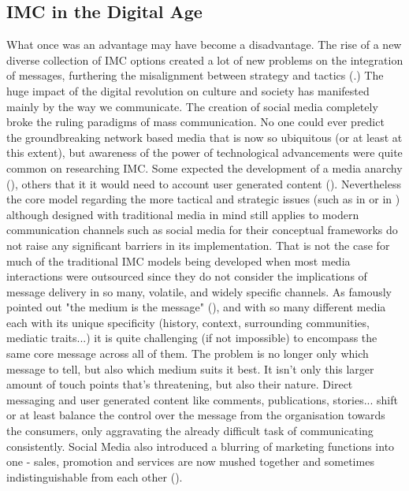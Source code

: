 \documentclass[11pt]{article}
\begin{document}
 \subsection{IMC in the Digital Age}\label{digitalage}
 
 What once was an advantage may have become a disadvantage. The rise of a new diverse collection of IMC options created a lot of new problems on the integration of messages, furthering the misalignment between strategy and tactics (\cite{holm}.) The huge impact of the digital revolution on culture and society has manifested mainly by the way we communicate. The creation of social media completely broke the ruling paradigms of mass communication. No one could ever predict the groundbreaking network based media that is now so ubiquitous (or at least at this extent), but awareness of the power of technological advancements were quite common on researching IMC. Some expected the development of a media anarchy (\cite{solomon}), others that it it would need to account user generated content (\cite{ananda}). Nevertheless the core model regarding the more tactical and strategic issues (such as \citeauthor{schultz} in \citeyear{schultz} or \citeauthor{duncan} in \citeyear{duncan}) although designed with traditional media in mind still applies to modern communication channels such as social media for their conceptual frameworks do not raise any significant barriers in its implementation. That is not the case for much of the traditional IMC models being developed when most media interactions were outsourced since they do not consider the implications of message delivery in so many, volatile, and widely specific channels. As \citeauthor{mcluhan} famously pointed out "the medium is the message" (\citeyear{mcluhan}), and with so many different media each with its unique specificity (history, context, surrounding communities, mediatic traits...) it is quite challenging (if not impossible) to encompass the same core message across all of them. The problem is no longer only which message to tell, but also which medium suits it best. It isn't only this larger amount of touch points that's threatening, but also their nature. Direct messaging and user generated content like comments, publications, stories... shift or at least balance the control over the message from the organisation towards the consumers, only aggravating the already difficult task of communicating consistently. Social Media also introduced a blurring of marketing functions into one - sales, promotion and services are now mushed together and sometimes indistinguishable from each other (\cite{valos}).  
\end{document}
